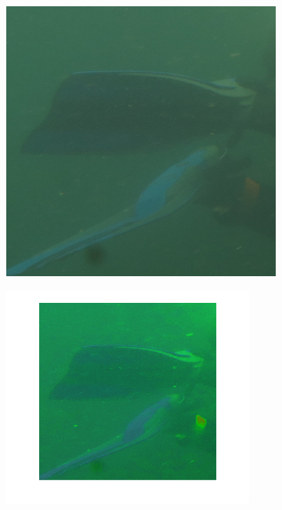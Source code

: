 \documentclass{article}
\begin{document}
\begin{figure}[H]
	\begin{subfigure}{0.5\textwidth}
	\centering
        \includegraphics[scale=0.4]{1908xxx.png}
    \end{subfigure}\hfill
	\begin{subfigure}{0.5\textwidth}
	\centering
        \includegraphics[width=0.9\textwidth]{transf1.png}

\end{subfigure}
\end{figure}
\end{document}

